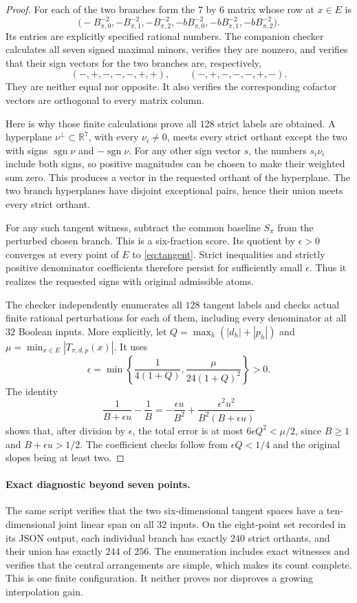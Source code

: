 \documentclass[11pt]{article}
\begin{document}
\begin{proof}
For each of the two branches form the $7$ by $6$ matrix whose row at
$x\in E$ is
\[
 \bigl(-B_{\pi,0}^{-2},-B_{\pi,1}^{-2},-B_{\pi,2}^{-2},
       -bB_{\pi,0}^{-2},-bB_{\pi,1}^{-2},-bB_{\pi,2}^{-2}\bigr).
\]
Its entries are explicitly specified rational numbers. The companion
checker calculates all seven signed maximal minors, verifies they are
nonzero, and verifies that their sign vectors for the two branches
are, respectively,
\[
 (-,+,-,-,-,+,+),\qquad(-,+,-,-,-,+,-).
\]
They are neither equal nor opposite. It also verifies the corresponding
cofactor vectors are orthogonal to every matrix column.

Here is why those finite calculations prove all $128$ strict labels
are obtained. A hyperplane $\nu^\perp\subset\mathbb R^7$, with every
$\nu_i\ne0$, meets every strict orthant except the two with signs
$\operatorname{sgn}\nu$ and $-\operatorname{sgn}\nu$.
For any other sign vector $s$, the numbers $s_i\nu_i$ include both
signs, so positive magnitudes can be chosen to make their weighted
sum zero. This produces a vector in the requested orthant of the
hyperplane. The two branch hyperplanes have disjoint exceptional
pairs, hence their union meets every strict orthant.

For any such tangent witness, subtract the common baseline $S_\pi$
from the perturbed chosen branch. This is a six-fraction score.
Its quotient by $\epsilon>0$ converges at every point of $E$ to
\eqref{eq:tangent}. Strict inequalities and strictly positive
denominator coefficients therefore persist for sufficiently small
$\epsilon$. Thus it realizes the requested signs with original
admissible atoms.

The checker independently enumerates all $128$ tangent labels and
checks actual finite rational perturbations for each of them, including
every denominator at all $32$ Boolean inputs. More explicitly, let
$Q=\max_h(|d_h|+|p_h|)$ and
$\mu=\min_{x\in E}|T_{\pi,d,p}(x)|$. It uses
\[
 \epsilon=\min\left\{\frac1{4(1+Q)},
                  \frac{\mu}{24(1+Q)^2}\right\}>0.
\]
The identity
\[
 \frac1{B+\epsilon u}-\frac1B
 =-\frac{\epsilon u}{B^2}
  +\frac{\epsilon^2u^2}{B^2(B+\epsilon u)}
\]
shows that, after division by $\epsilon$, the total error is at most
$6\epsilon Q^2<\mu/2$, since $B\geq1$ and
$B+\epsilon u>1/2$. The coefficient checks follow from
$\epsilon Q<1/4$ and the original slopes being at least two.
\end{proof}

\paragraph{Exact diagnostic beyond seven points.}
The same script verifies that the two six-dimensional tangent spaces
have a ten-dimensional joint linear span on all $32$ inputs. On the
eight-point set recorded in its JSON output, each individual branch
has exactly $240$ strict orthants, and their union has exactly $244$
of $256$. The enumeration includes exact witnesses and verifies that
the central arrangements are simple, which makes its count complete.
This is one finite configuration. It neither proves nor disproves a
growing interpolation gain.
\end{document}
